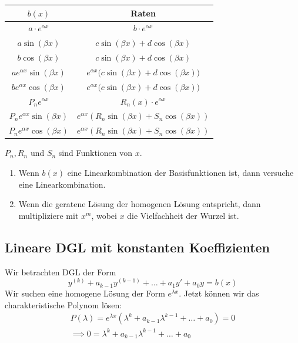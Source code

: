 \documentclass[a4paper,10pt]{article}
\begin{document}
\begin{center}
  \renewcommand*{\arraystretch}{1.6}
  \begin{tabular}{cc} 
    \toprule
    $b(x)$ & Raten \\ 
    \midrule
    $a \cdot e^{\alpha x}$ & $b \cdot e^{\alpha x}$\\
    $a \sin(\beta x)$ & $c \sin(\beta x) + d \cos(\beta x)$\\
    $b \cos(\beta x)$ & $c \sin(\beta x) + d \cos(\beta x)$\\
    $a e^{\alpha x} \sin(\beta x)$ & $e^{\alpha x} \Big( c \sin(\beta x) + d \cos(\beta x) \Big)$\\
    $b e^{\alpha x} \cos(\beta x)$ & $e^{\alpha x} \Big( c \sin(\beta x) + d \cos(\beta x) \Big)$\\
    $P_n e^{\alpha x}$ & $R_n(x) \cdot e^{\alpha x}$\\
    $P_n e^{\alpha x} \sin(\beta x)$ & $e^{\alpha x} \left( R_n \sin(\beta x) + S_n \cos(\beta x) \right)$\\
    $P_n e^{\alpha x} \cos(\beta x)$ & $e^{\alpha x} \left( R_n \sin(\beta x) + S_n \cos(\beta x) \right)$\\
    \bottomrule
  \end{tabular}
\end{center}

\(P_n, R_n \) und \(S_n\) sind Funktionen von \(x\). 

\begin{enumerate}
  \item Wenn \(b(x)\) eine Linearkombination der Basisfunktionen ist, dann versuche eine Linearkombination.
  \item Wenn die geratene Lösung der homogenen Lösung entspricht, dann multipliziere mit \(x^m\), wobei \(x\) die Vielfachheit der Wurzel ist.
\end{enumerate}

\subsection{Lineare DGL mit konstanten Koeffizienten}
Wir betrachten DGL der Form
\[y^{(k)} + a_{k-1} y^{(k-1)} + \ldots + a_1 y' + a_0 y = b(x)\]
Wir suchen eine homogene Lösung der Form \(e^{\lambda x}\). Jetzt können wir das charakteristische Polynom lösen:
\begin{align*}
  P(\lambda) = e^{\lambda x} \left(\lambda^k + a_{k-1}\lambda^{k-1} + \ldots + a_0\right) = 0 \\ 
  \implies 0 = \lambda^k + a_{k-1}\lambda^{k-1} + \ldots+ a_0
\end{align*}
\end{document}
